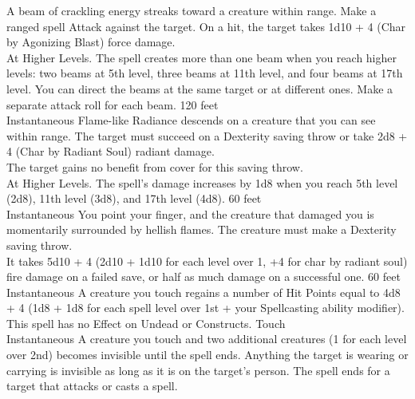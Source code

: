 \documentclass{article}
\begin{document}
\newpage
%
    {A beam of crackling energy streaks toward a creature within range. Make a ranged spell Attack against the target. On a hit, the target takes 1d10 + 4 (Char by Agonizing Blast) force damage.
    \\[1mm]
    At Higher Levels. The spell creates more than one beam when you reach higher levels: two beams at 5th level, three beams at 11th level, and four beams at 17th level. You can direct the beams at the same target or at different ones. Make a separate attack roll for each beam.}
    {120 feet\\Instantaneous}%
    {Flame-like Radiance descends on a creature that you can see within range. The target must succeed on a Dexterity saving throw or take 2d8 + 4 (Char by Radiant Soul) radiant damage.
    \\[1mm]
    The target gains no benefit from cover for this saving throw.
    \\[1mm]
    At Higher Levels. The spell’s damage increases by 1d8 when you reach 5th level (2d8), 11th level (3d8), and 17th level (4d8).}
    {60 feet\\Instantaneous}%
    {You point your finger, and the creature that damaged you is momentarily surrounded by hellish flames. The creature must make a Dexterity saving throw.
    \\[1mm]
    It takes 5d10 + 4 (2d10 + 1d10 for each level over 1, +4 for char by radiant soul) fire damage on a failed save, or half as much damage on a successful one.}
    {60 feet\\Instantaneous}%
    {A creature you touch regains a number of Hit Points equal to 4d8 + 4 (1d8 + 1d8 for each spell level over 1st + your Spellcasting ability modifier).
    \\[1mm]
    This spell has no Effect on Undead or Constructs.}
    {Touch\\Instantaneous}%
    {A creature you touch and two additional creatures (1 for each level over 2nd) becomes invisible until the spell ends. Anything the target is wearing or carrying is invisible as long as it is on the target’s person. The spell ends for a target that attacks or casts a spell.}
\end{document}
